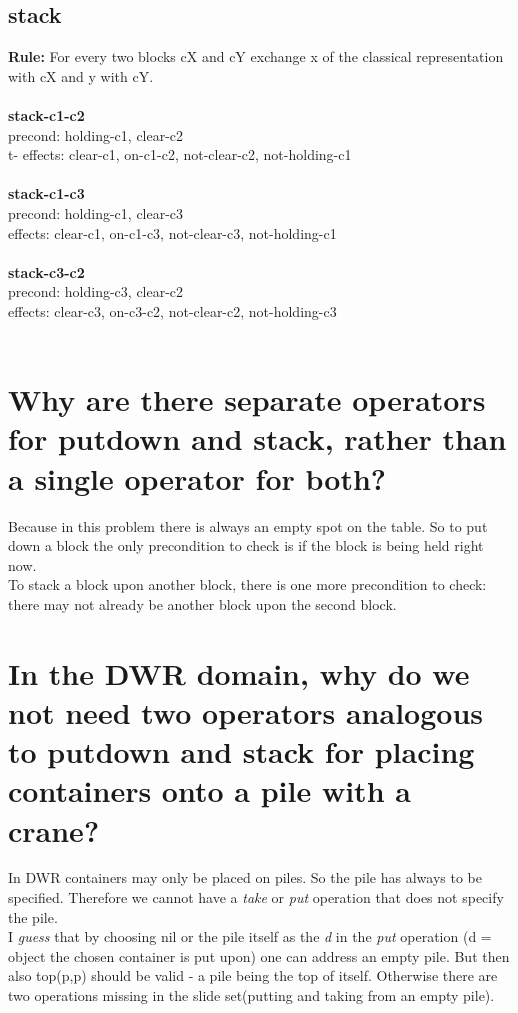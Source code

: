 \documentclass[paper=a4, fontsize=11pt]{scrartcl} %
\numberwithin{equation}{section} %
\numberwithin{figure}{section} %
\numberwithin{table}{section} %
\begin{document}
\subsection{stack}
\textbf{Rule:} For every two blocks cX and cY exchange x of the classical representation with cX and y with cY.\\\\

\textbf{stack-c1-c2}\\
precond: holding-c1, clear-c2\\t-
effects: clear-c1, on-c1-c2, not-clear-c2, not-holding-c1\\\\

\textbf{stack-c1-c3}\\
precond: holding-c1, clear-c3\\
effects: clear-c1, on-c1-c3, not-clear-c3, not-holding-c1\\\\

\textbf{stack-c3-c2}\\
precond: holding-c3, clear-c2\\
effects: clear-c3, on-c3-c2, not-clear-c2, not-holding-c3\\\\

\section{Why are there separate operators for putdown and stack, rather than a single operator for
both?}

Because in this problem there is always an empty spot on the table. So to put down a block the only precondition to check is if the block is being held right now.\\
To stack a block upon another block, there is one more precondition to check: there may not already be another block upon the second block.

\section{In the DWR domain, why do we not need two operators analogous to putdown and stack for placing containers onto a pile with a crane?}

In DWR containers may only be placed on piles. So the pile has always to be specified. Therefore we cannot have a \textit{take} or \textit{put} operation that does not specify the pile.\\
I \textit{guess} that by choosing nil or the pile itself as the \textit{d} in the \textit{put} operation (d = object the chosen container is put upon) one can address an empty pile. But then also top(p,p) should be valid - a pile being the top of itself. Otherwise there are two operations missing in the slide set(putting and taking from an empty pile).
\end{document}
